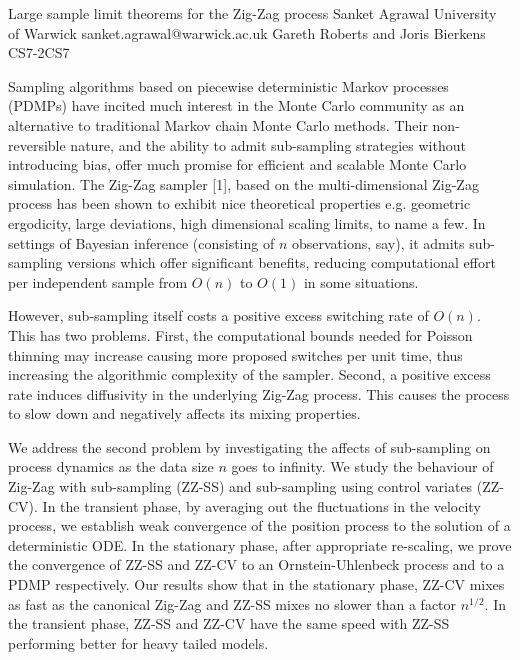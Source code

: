\begin{talk}
  {Large sample limit theorems for the Zig-Zag process}%
  {Sanket Agrawal}%
  {University of Warwick}%
  {sanket.agrawal@warwick.ac.uk}%
  {Gareth Roberts and Joris Bierkens}%
{}{}{CS7-2}{CS7}


				
				

    Sampling algorithms based on piecewise deterministic Markov processes (PDMPs) have incited much interest in the Monte Carlo community as an alternative to traditional Markov chain Monte Carlo methods. Their non-reversible nature, and the ability to admit sub-sampling strategies without introducing bias, offer much promise for efficient and scalable Monte Carlo simulation. The Zig-Zag sampler [1], based on the multi-dimensional Zig-Zag process has been shown to exhibit nice theoretical properties e.g. geometric ergodicity, large deviations, high dimensional scaling limits, to name a few. In settings of Bayesian inference (consisting of $n$ observations, say), it admits sub-sampling versions which offer significant benefits, reducing computational effort per independent sample from $O(n)$ to $O(1)$ in some situations. 

    However, sub-sampling itself costs a positive excess switching rate of $O(n)$. This has two problems. First, the computational bounds needed for Poisson thinning may increase causing more proposed switches per unit time, thus increasing the algorithmic complexity of the sampler. Second, a positive excess rate induces diffusivity in the underlying Zig-Zag process. This causes the process to slow down and negatively affects its mixing properties. 

    We address the second problem by investigating the affects of sub-sampling on process dynamics as the data size $n$ goes to infinity. We study the behaviour of Zig-Zag with sub-sampling (ZZ-SS) and sub-sampling using control variates (ZZ-CV). In the transient phase, by averaging out the fluctuations in the velocity process, we establish weak convergence of the position process to the solution of a deterministic ODE. In the stationary phase, after appropriate re-scaling, we prove the convergence of ZZ-SS and ZZ-CV to an Ornstein-Uhlenbeck process and to a PDMP respectively. Our results show that in the stationary phase, ZZ-CV mixes as fast as the canonical Zig-Zag and ZZ-SS mixes no slower than a factor $n^{1/2}$. In the transient phase, ZZ-SS and ZZ-CV have the same speed with ZZ-SS performing better for heavy tailed models. 


\end{talk}
